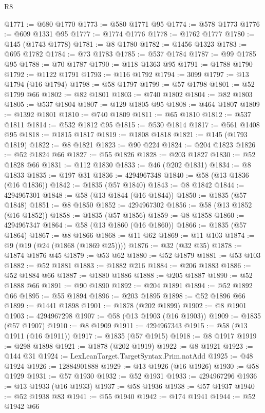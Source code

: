 \begin{lexlean}{R8}
\begin{coremodule}
@1771 := @680 @1770
@1773 := @580 @1771 @95
@1774 := @578 @1773
@1776 := @609 @1331 @95
@1777 := @1774 @1776
@1778 := @1762 @1777
@1780 := @145 (@1743 @1778)
@1781 := @8 @1780
@1782 := @1456 @1323
@1783 := @695 @1782
@1784 := @73 @1783
@1785 := @537 @1784
@1787 := @99 @1785 @95
@1788 := @70 @1787
@1790 := @118 @1363 @95
@1791 := @1788 @1790
@1792 := @1122 @1791
@1793 := @116 @1792
@1794 := 3099
@1797 := @13 @1794 (@16 @1794)
@1798 := @58 @1797
@1799 := @57 @1798
@1801 := @52 @1799 @66
@1802 := @82 @1801
@1803 := @740 @1802
@1804 := @82 @1803
@1805 := @537 @1804
@1807 := @129 @1805 @95
@1808 := @464 @1807
@1809 := @1392 @1801
@1810 := @740 @1809
@1811 := @65 @1810
@1812 := @537 @1811
@1814 := @532 @1812 @95
@1815 := @530 @1814
@1817 := @561 @1408 @95
@1818 := @1815 @1817
@1819 := @1808 @1818
@1821 := @145 (@1793 @1819)
@1822 := @8 @1821
@1823 := @90 @224
@1824 := @204 @1823
@1826 := @52 @1824 @66
@1827 := @55 @1826
@1828 := @203 @1827
@1830 := @52 @1828 @66
@1831 := @112 @1830
@1833 := @46 (@202 @1831)
@1834 := @8 @1833
@1835 := @197 @31
@1836 := 4294967348
@1840 := @58 (@13 @1836 (@16 @1836))
@1842 := @1835 (@57 @1840)
@1843 := @8 @1842
@1844 := 4294967301
@1848 := @58 (@13 @1844 (@16 @1844))
@1850 := @1835 (@57 @1848)
@1851 := @8 @1850
@1852 := 4294967302
@1856 := @58 (@13 @1852 (@16 @1852))
@1858 := @1835 (@57 @1856)
@1859 := @8 @1858
@1860 := 4294967347
@1864 := @58 (@13 @1860 (@16 @1860))
@1866 := @1835 (@57 @1864)
@1867 := @8 @1866
@1868 := @11 @62
@1869 := @11 @103
@1874 := @9 (@19 (@24 (@1868 (@1869 @25))))
@1876 := @32 (@32 @35)
@1878 := @1874 @1876 @45
@1879 := @53 @62
@1880 := @52 @1879
@1881 := @53 @103
@1882 := @52 @1881
@1883 := @1882 @216
@1884 := @206 @1883
@1886 := @52 @1884 @66
@1887 := @1880 @1886
@1888 := @205 @1887
@1890 := @52 @1888 @66
@1891 := @90 @1890
@1892 := @204 @1891
@1894 := @52 @1892 @66
@1895 := @55 @1894
@1896 := @203 @1895
@1898 := @52 @1896 @66
@1899 := @1441 @1898
@1901 := @1878 (@202 @1899)
@1902 := @8 @1901
@1903 := 4294967298
@1907 := @58 (@13 @1903 (@16 @1903))
@1909 := @1835 (@57 @1907)
@1910 := @8 @1909
@1911 := 4294967343
@1915 := @58 (@13 @1911 (@16 @1911))
@1917 := @1835 (@57 @1915)
@1918 := @8 @1917
@1919 := @298 @1898
@1921 := @1878 (@202 @1919)
@1922 := @8 @1921
@1923 := @144 @31
@1924 := LexLeanTarget.TargetSyntax.Prim.natAdd
@1925 := @48 @1924
@1926 := 12884901888
@1929 := @13 @1926 (@16 @1926)
@1930 := @58 @1929
@1931 := @57 @1930
@1932 := @52 @1931
@1933 := 4294967296
@1936 := @13 @1933 (@16 @1933)
@1937 := @58 @1936
@1938 := @57 @1937
@1940 := @52 @1938 @83
@1941 := @55 @1940
@1942 := @174 @1941
@1944 := @52 @1942 @66

\end{coremodule}
\end{lexlean}
